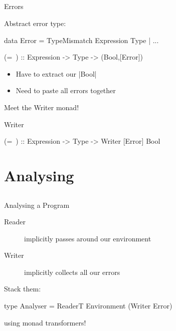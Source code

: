 \subsection*{}

\begin{frame}[fragile]{Errors}

  Abstract error type:

    \begin{code}
      data Error = TypeMismatch Expression Type | ...
    \end{code}
  
  \pause

  \begin{block}{}
    \begin{code}
      (=~) :: Expression -> Type -> (Bool,[Error])
    \end{code}
  \end{block}

  \pause

  \begin{itemize}
    \item Have to extract our |Bool| \frownie
    \item Need to paste all errors together \frownie
  \end{itemize}

  \pause
  Meet the Writer monad!

  \begin{block}{Writer}
    \begin{code}
      (=~) :: Expression -> Type -> Writer [Error] Bool
    \end{code}
  \end{block}

\end{frame}

\section{Analysing}
\subsection*{}

\begin{frame}[fragile]{Analysing a Program}
  
  \begin{description}
    \item[Reader] implicitly passes around our environment
    \item[Writer] implicitly collects all our errors
  \end{description}

  \pause
  \bigskip

  Stack them:

  \begin{block}{}
    \begin{code}
      type Analyser = ReaderT Environment (Writer Error)
    \end{code}
  \end{block}

  using monad transformers!

\end{frame}

